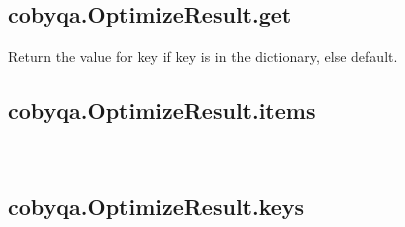 \documentclass[letterpaper,10pt,english]{sphinxmanual}
\begin{document}
\begin{fulllineitems}
\subsection{cobyqa.OptimizeResult.get}
\label{\detokenize{refs/generated/cobyqa.OptimizeResult.get:cobyqa-optimizeresult-get}}\label{\detokenize{refs/generated/cobyqa.OptimizeResult.get::doc}}

\begin{fulllineitems}
\label{\detokenize{refs/generated/cobyqa.OptimizeResult.get:cobyqa.OptimizeResult.get}}
\sphinxAtStartPar
Return the value for key if key is in the dictionary, else default.

\end{fulllineitems}



\subsection{cobyqa.OptimizeResult.items}
\label{\detokenize{refs/generated/cobyqa.OptimizeResult.items:cobyqa-optimizeresult-items}}\label{\detokenize{refs/generated/cobyqa.OptimizeResult.items::doc}}

\begin{fulllineitems}
\label{\detokenize{refs/generated/cobyqa.OptimizeResult.items:cobyqa.OptimizeResult.items}}~
\end{fulllineitems}



\subsection{cobyqa.OptimizeResult.keys}
\label{\detokenize{refs/generated/cobyqa.OptimizeResult.keys:cobyqa-optimizeresult-keys}}\label{\detokenize{refs/generated/cobyqa.OptimizeResult.keys::doc}}


\end{fulllineitems}
\end{document}
